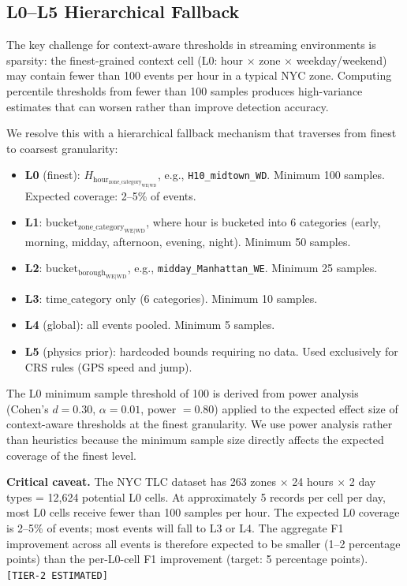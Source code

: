 \subsection{L0--L5 Hierarchical Fallback}

The key challenge for context-aware thresholds in streaming environments is
sparsity: the finest-grained context cell (L0: hour $\times$ zone
$\times$ weekday/weekend) may contain fewer than 100 events per hour in
a typical NYC zone. Computing percentile thresholds from fewer than 100
samples produces high-variance estimates that can worsen rather than improve
detection accuracy.

We resolve this with a hierarchical fallback mechanism that traverses from
finest to coarsest granularity:

\begin{itemize}
  \item \textbf{L0} (finest): $H_{\text{hour}}_{\text{zone\_category}}_{\text{WE|WD}}$,
        e.g., \texttt{H10\_midtown\_WD}. Minimum 100 samples.
        Expected coverage: 2--5\% of events.
  \item \textbf{L1}: $\text{bucket}_{\text{zone\_category}}_{\text{WE|WD}}$,
        where hour is bucketed into 6 categories (early, morning, midday,
        afternoon, evening, night). Minimum 50 samples.
  \item \textbf{L2}: $\text{bucket}_{\text{borough}}_{\text{WE|WD}}$,
        e.g., \texttt{midday\_Manhattan\_WE}. Minimum 25 samples.
  \item \textbf{L3}: $\text{time\_category}$ only (6 categories).
        Minimum 10 samples.
  \item \textbf{L4} (global): all events pooled. Minimum 5 samples.
  \item \textbf{L5} (physics prior): hardcoded bounds requiring no data.
        Used exclusively for CRS rules (GPS speed and jump).
\end{itemize}

The L0 minimum sample threshold of 100 is derived from power analysis
(Cohen's $d = 0.30$, $\alpha = 0.01$, power $= 0.80$) applied to the
expected effect size of context-aware thresholds at the finest granularity.
We use power analysis rather than heuristics because the minimum sample
size directly affects the expected coverage of the finest level.

\textbf{Critical caveat.} The NYC TLC dataset has 263 zones $\times$ 24 hours
$\times$ 2 day types = 12,624 potential L0 cells. At approximately 5 records
per cell per day, most L0 cells receive fewer than 100 samples per hour.
The expected L0 coverage is 2--5\% of events; most events will fall to
L3 or L4. The aggregate F1 improvement across all events is therefore
expected to be smaller (1--2 percentage points) than the per-L0-cell F1
improvement (target: 5 percentage points).
\texttt{[TIER-2\ ESTIMATED]}

